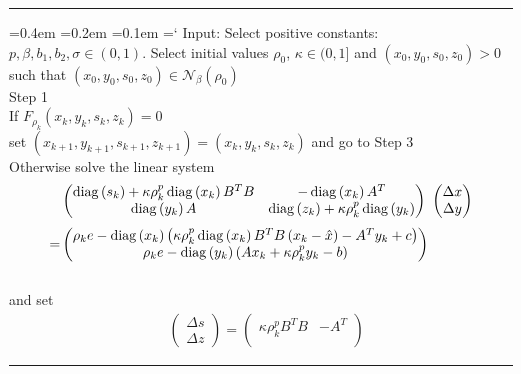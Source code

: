 \documentclass{report}
\theoremstyle{plain}
\theoremstyle{remark}
\newenvironment{algorithmJP} 
{\def\block{\phantom{a}\hspace{10pt}}\setlength{\parindent}{0pt} \par \vspace{\baselineskip}\hrule%
\smallskip \ttfamily %
\fontdimen2\font=0.4em%
\fontdimen3\font=0.2em%
\fontdimen7\font=0.1em%
\hyphenchar\font=`\-%
}
{\smallskip \hrule \vspace{\baselineskip}\par}
\newcommand\en{\mathcal{N}}
\newcommand\diag{\mathop{\rm diag}}
\begin{document}
\nopagecolor
\rmfamily\normalsize
\begin{algorithmJP}%
Input: Select positive constants: $p, \beta, b_1, b_2, \sigma \in (0,1)$. Select initial values $\rho_0$, $\kappa \in (0,1]$ and $(x_0,y_0,s_0,z_0) >0$ such that $(x_0,y_0,s_0,z_0)\in \en_\beta(\rho_0)$  \\[5pt]
Step 1  \\ 
\block If $F_{\rho_k}(x_k,y_k,s_k,z_k)= 0$   \\
\block set $(x_{k+1},y_{k+1},s_{k+1},z_{k+1}) = (x_k,y_k,s_k,z_k)$ and go to Step 3 \\
\block Otherwise solve the linear system\\
\block  \begin{equation*}
	\begin{split}
         & \begin{pmatrix} 
         \diag\left(s_k\right) + \kappa\rho_k^p\diag\left(x_k\right)B^TB & -\diag\left(x_k\right) A^T\\
         \diag\left(y_k\right)A & \diag\left(z_k\right)+\kappa\rho_k^p\diag\left(y_k\right)
         \end{pmatrix}
         \ 
         \begin{pmatrix} 
          \Delta x\\
          \Delta y
         \end{pmatrix} \\[3pt]
         =
         & 
         \begin{pmatrix} 
         \rho_k e - \diag\left(x_k\right)\left(\kappa\rho_k^p\diag\left(x_k\right)B^TB\left(x_k - \hat x\right) - A^Ty_k + c\right)\\
         \rho_k e - \diag\left(y_k\right)\left(Ax_k + \kappa \rho_k^p y_k -b\right)
         \end{pmatrix}
	\end{split}
        \end{equation*}\\
\block and set \\
\block \begin{equation*}
	\begin{split}
	& 
         \begin{pmatrix}
          \Delta s\\
          \Delta z
         \end{pmatrix} 
           = 
         \begin{pmatrix} 
           \kappa\rho_k^p B^TB & -  A^T\\

\end{pmatrix}
\end{split}
\end{equation*}
\end{algorithmJP}
\end{document}

